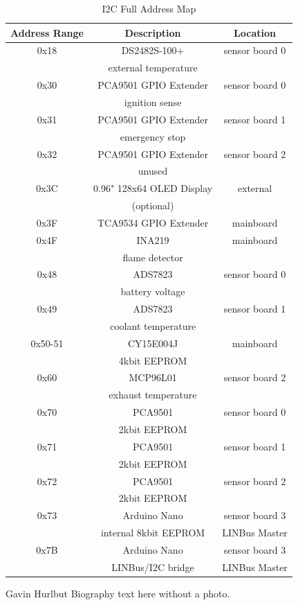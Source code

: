 \documentclass[lettersize,journal]{IEEEtran}
\begin{document}
\begin{table}
\begin{center}
\caption{I2C Full Address Map}
\label{i2c-full}
\begin{tabular}{| c | c | c |}
\hline
Address Range & Description & Location \\
\hline
0x18 & DS2482S-100+ & sensor board 0 \\
& external temperature & \\
\hline
0x30 & PCA9501 GPIO Extender & sensor board 0 \\
& ignition sense & \\
\hline
0x31 & PCA9501 GPIO Extender & sensor board 1 \\
& emergency stop & \\
\hline
0x32 & PCA9501 GPIO Extender & sensor board 2 \\
& unused & \\
\hline
0x3C & 0.96" 128x64 OLED Display & external \\
& (optional) & \\
\hline
0x3F & TCA9534 GPIO Extender & mainboard \\
\hline
0x4F & INA219 & mainboard \\
& flame detector & \\
\hline
0x48 & ADS7823 & sensor board 0 \\
& battery voltage & \\
\hline
0x49 & ADS7823 & sensor board 1 \\
& coolant temperature & \\
\hline
0x50-51 & CY15E004J & mainboard \\
& 4kbit EEPROM & \\
\hline
0x60 & MCP96L01 & sensor board 2 \\
&  exhaust temperature & \\
\hline
0x70 & PCA9501 & sensor board 0 \\
& 2kbit EEPROM & \\
\hline
0x71 & PCA9501 & sensor board 1 \\
& 2kbit EEPROM & \\
\hline
0x72 & PCA9501 & sensor board 2 \\
& 2kbit EEPROM & \\
\hline
0x73 & Arduino Nano & sensor board 3 \\
& internal 8kbit EEPROM & LINBus Master \\
\hline
0x7B & Arduino Nano & sensor board 3 \\
& LINBus/I2C bridge & LINBus Master \\
\hline
\end{tabular}
\end{center}
\end{table}



\begin{IEEEbiographynophoto}{Gavin Hurlbut}
Biography text here without a photo.
\end{IEEEbiographynophoto}
\end{document}
